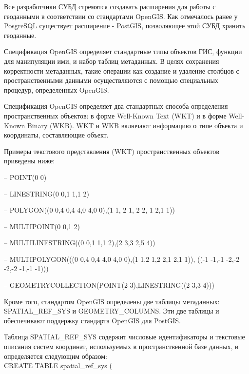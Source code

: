 \documentclass[12pt,a4paper,oneside]{article} %
\begin{document}
Все разработчики СУБД стремятся создавать расширения для работы \linebreak
с геоданными в соответствии со стандартами OpenGIS. Как отмечалось \linebreak
ранее у PosgreSQL существует расширение - PostGIS, позволяющее \linebreak
этой СУБД хранить геоданные.

Спецификация OpenGIS определяет стандартные типы объектов ГИС, \linebreak
функции для манипуляции ими, и набор таблиц метаданных. В целях \linebreak
сохранения корректности метаданных, такие операции как создание \linebreak
и удаление столбцов с пространственными данными осуществляются \linebreak
с помощью специальных процедур, определенных OpenGIS.

Спецификация OpenGIS определяет два стандартных способа \linebreak
определения пространственных объектов: в форме Well-Known Text \linebreak
(WKT) и в форме Well-Known Binary (WKB). WKT и WKB включают \linebreak
информацию о типе объекта и координаты, составляющие объект.

Примеры текстового представления (WKT) пространственных \linebreak
объектов приведены ниже:

-- POINT(0 0)

-- LINESTRING(0 0,1 1,1 2)

-- POLYGON((0 0,4 0,4 4,0 4,0 0),(1 1, 2 1, 2 2, 1 2,1 1))

-- MULTIPOINT(0 0,1 2)

-- MULTILINESTRING((0 0,1 1,1 2),(2 3,3 2,5 4))

-- MULTIPOLYGON(((0 0,4 0,4 4,0 4,0 0),(1 1,2 1,2 2,1 2,1 1)), \linebreak
((-1 -1,-1 -2,-2 -2,-2 -1,-1 -1)))

-- GEOMETRYCOLLECTION(POINT(2 3),LINESTRING((2 3,3 4)))

Кроме того, стандартом OpenGIS определены две таблицы метаданных: \linebreak
SPATIAL\_REF\_SYS и GEOMETRY\_COLUMNS. Эти две таблицы и \linebreak
обеспечивают поддержку стандарта OpenGIS для PostGIS.

Таблица SPATIAL\_REF\_SYS содержит числовые идентификаторы и \linebreak
текстовые описания систем координат, используемых в \linebreak
пространственной базе данных, и определяется следующим образом:
\\[10pt]
CREATE TABLE spatial\_ref\_sys (
\end{document}
